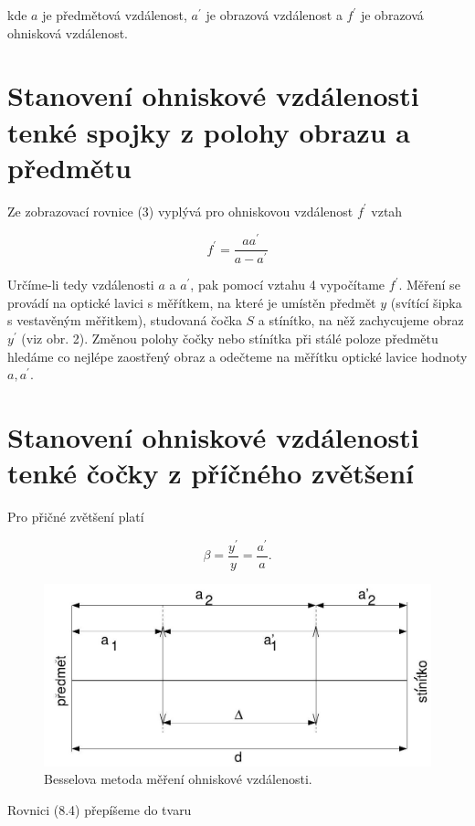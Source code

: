 \documentclass[czech,11pt,a4paper]{article}
\begin{document}
\begin{multicols}{2}
kde $a$ je předmětová vzdálenost, $a^{\prime}$ je obrazová vzdálenost a $f^{\prime}$ je obrazová ohnisková vzdálenost.

\section{Stanovení ohniskové vzdálenosti tenké spojky z polohy obrazu a předmětu}

Ze zobrazovací rovnice (3) vyplývá pro ohniskovou vzdálenost $f^{\prime}$ vztah

\begin{equation}
	f^{\prime}=\frac{a a^{\prime}}{a-a^{\prime}}
\end{equation}


Určíme-li tedy vzdálenosti $a$ a $a^{\prime}$, pak pomocí vztahu 4 vypočítame $f^{\prime}$. Měření se provádí na optické lavici s měřítkem, na které je umístěn předmět $y$ (svítící šipka s vestavěným měřitkem), studovaná čočka $S$ a stínítko, na něž zachycujeme obraz $y^{\prime}$ (viz obr. 2). Změnou polohy čočky nebo stínítka při stálé poloze předmětu hledáme co nejlépe zaostřený obraz a odečteme na měřítku optické lavice hodnoty $a, a^{\prime}$.

\section*{Stanovení ohniskové vzdálenosti tenké čočky z příčného zvětšení}

Pro přičné zvětšení platí

\begin{equation}
	\beta=\frac{y^{\prime}}{y}=\frac{a^{\prime}}{a} .
\end{equation}

\begin{figure}[H]
	\includegraphics[width = 0.95\linewidth, center]{2024_12_03_2b013636ff75d184213cg-3}
	\caption{Besselova metoda měření ohniskové vzdálenosti.}
\end{figure}
Rovnici (8.4) přepíšeme do tvaru


\end{multicols}
\end{document}
